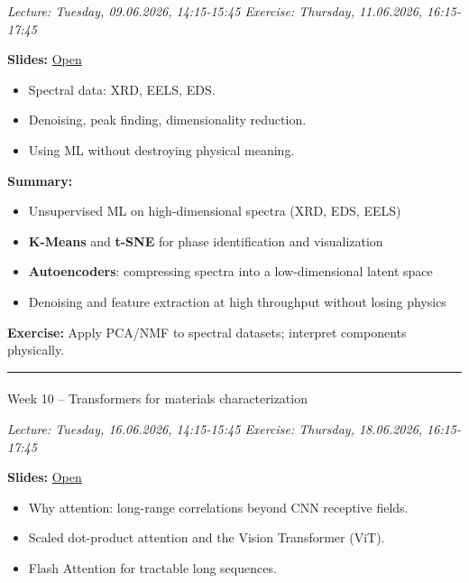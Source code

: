 \documentclass[
]{agujournal2019}
\makeatletter
\let\oldparagraph\paragraph
\renewcommand{\paragraph}{
    \@ifstar
      \xxxParagraphStar
      \xxxParagraphNoStar
  }
\newcommand{\xxxParagraphStar}[1]{\oldparagraph*{#1}\mbox{}}
\newcommand{\xxxParagraphNoStar}[1]{\oldparagraph{#1}\mbox{}}
\providecommand{\tightlist}{%
  \setlength{\itemsep}{0pt}\setlength{\parskip}{0pt}}
\makeatother
\begin{document}
\emph{Lecture: Tuesday, 09.06.2026, 14:15-15:45 \textbar{} Exercise:
Thursday, 11.06.2026, 16:15-17:45}

\textbf{Slides:}
\href{https://pelzlab.science/public_presentations/ml_for_characterization_and_processing/unit09_characterization_signals/10_characterization_signals.html}{Open}

\begin{itemize}
\tightlist
\item
  Spectral data: XRD, EELS, EDS.
\item
  Denoising, peak finding, dimensionality reduction.
\item
  Using ML without destroying physical meaning.
\end{itemize}

\textbf{Summary:}

\begin{itemize}
\tightlist
\item
  Unsupervised ML on high-dimensional spectra (XRD, EDS, EELS)
\item
  \textbf{K-Means} and \textbf{t-SNE} for phase identification and
  visualization
\item
  \textbf{Autoencoders}: compressing spectra into a low-dimensional
  latent space
\item
  Denoising and feature extraction at high throughput without losing
  physics
\end{itemize}

\textbf{Exercise:} Apply PCA/NMF to spectral datasets; interpret
components physically.

\begin{center}\rule{0.5\linewidth}{0.5pt}\end{center}

\paragraph{Week 10 -- Transformers for materials
characterization}\label{week-10-transformers-for-materials-characterization}

\emph{Lecture: Tuesday, 16.06.2026, 14:15-15:45 \textbar{} Exercise:
Thursday, 18.06.2026, 16:15-17:45}

\textbf{Slides:}
\href{https://pelzlab.science/public_presentations/ml_for_characterization_and_processing/unit10_transformers_for_materials/transformers_for_materials.html}{Open}

\begin{itemize}
\tightlist
\item
  Why attention: long-range correlations beyond CNN receptive fields.
\item
  Scaled dot-product attention and the Vision Transformer (ViT).
\item
  Flash Attention for tractable long sequences.
\end{itemize}
\end{document}
